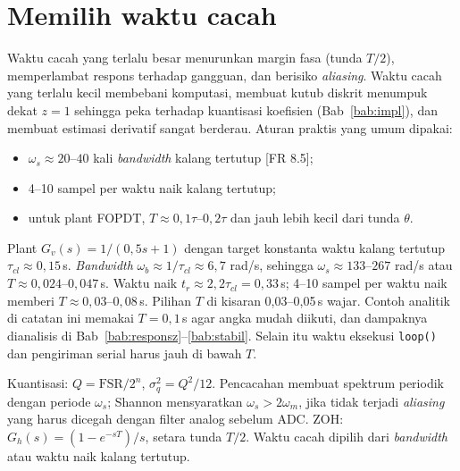 \section{Memilih waktu cacah}
Waktu cacah yang terlalu besar menurunkan margin fasa (tunda $T/2$), memperlambat respons terhadap gangguan, dan berisiko \textit{aliasing}. Waktu cacah yang terlalu kecil membebani komputasi, membuat kutub diskrit menumpuk dekat $z=1$ sehingga peka terhadap kuantisasi koefisien (Bab~\ref{bab:impl}), dan membuat estimasi derivatif sangat berderau. Aturan praktis yang umum dipakai:
\begin{itemize}
	\item $\omega_s \approx 20$--$40$ kali \textit{bandwidth} kalang tertutup [FR 8.5];
	\item 4--10 sampel per waktu naik kalang tertutup;
	\item untuk plant FOPDT, $T \approx 0{,}1\tau$--$0{,}2\tau$ dan jauh lebih kecil dari tunda $\theta$.
\end{itemize}

\begin{contoh}
	Plant $G_v(s) = 1/(0{,}5s+1)$ dengan target konstanta waktu kalang tertutup $\tau_{cl} \approx 0{,}15$\,s. \textit{Bandwidth} $\omega_b \approx 1/\tau_{cl} \approx 6{,}7$ rad/s, sehingga $\omega_s \approx 133$--$267$ rad/s atau $T \approx 0{,}024$--$0{,}047$\,s. Waktu naik $t_r \approx 2{,}2\tau_{cl} = 0{,}33$\,s; 4--10 sampel per waktu naik memberi $T \approx 0{,}03$--$0{,}08$\,s. Pilihan $T$ di kisaran 0,03--0,05\,s wajar. Contoh analitik di catatan ini memakai $T = 0{,}1$\,s agar angka mudah diikuti, dan dampaknya dianalisis di Bab~\ref{bab:responsz}--\ref{bab:stabil}. Selain itu waktu eksekusi \texttt{loop()} dan pengiriman serial harus jauh di bawah $T$.
\end{contoh}

\begin{ringkasan}
	Kuantisasi: $Q = \text{FSR}/2^n$, $\sigma_q^2 = Q^2/12$. Pencacahan membuat spektrum periodik dengan periode $\omega_s$; Shannon mensyaratkan $\omega_s > 2\omega_m$, jika tidak terjadi \textit{aliasing} yang harus dicegah dengan filter analog sebelum ADC. ZOH: $G_h(s) = (1-e^{-sT})/s$, setara tunda $T/2$. Waktu cacah dipilih dari \textit{bandwidth} atau waktu naik kalang tertutup.\\[3pt]
\end{ringkasan}

